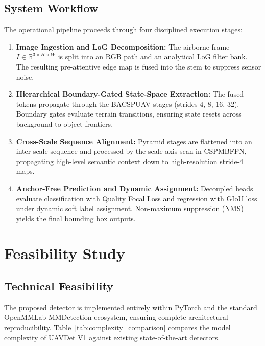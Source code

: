 \documentclass[12pt,a4paper]{report}
\begin{document}
\section{System Workflow}
The operational pipeline proceeds through four disciplined execution stages:
\begin{enumerate}[leftmargin=2em]
    \item \textbf{Image Ingestion and LoG Decomposition:} The airborne frame $I \in \mathbb{R}^{3 \times H \times W}$ is split into an RGB path and an analytical LoG filter bank. The resulting pre-attentive edge map is fused into the stem to suppress sensor noise.
    \item \textbf{Hierarchical Boundary-Gated State-Space Extraction:} The fused tokens propagate through the BACSPUAV stages (strides 4, 8, 16, 32). Boundary gates evaluate terrain transitions, ensuring state resets across background-to-object frontiers.
    \item \textbf{Cross-Scale Sequence Alignment:} Pyramid stages are flattened into an inter-scale sequence and processed by the scale-axis scan in CSPMBFPN, propagating high-level semantic context down to high-resolution stride-4 maps.
    \item \textbf{Anchor-Free Prediction and Dynamic Assignment:} Decoupled heads evaluate classification with Quality Focal Loss and regression with GIoU loss under dynamic soft label assignment. Non-maximum suppression (NMS) yields the final bounding box outputs.
\end{enumerate}

\chapter{Feasibility Study}

\section{Technical Feasibility}
The proposed detector is implemented entirely within PyTorch and the standard OpenMMLab MMDetection ecosystem, ensuring complete architectural reproducibility. Table~\ref{tab:complexity_comparison} compares the model complexity of UAVDet V1 against existing state-of-the-art detectors.
\end{document}
